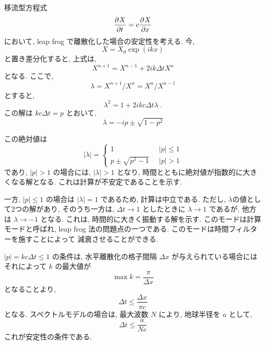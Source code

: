 移流型方程式 
\begin{equation}
  \DP{X}{t} = c \DP{X}{x}
\end{equation}
において,  leap frog で離散化した場合の安定性を考える.
今, 
\begin{displaymath}
  X = X_0 \exp(ikx)
\end{displaymath}
と置き差分化すると, 上式は,
\begin{equation}
  X^{n+1} = X^{n-1} + 2 i k \Delta t X^n
\end{equation}
となる.
ここで,
\begin{displaymath}
  \lambda = X^{n+1}/X^n = X^n/X^{n-1} 
\end{displaymath}
とすると,
\begin{equation}
  \lambda^2 = 1 + 2 i kc \Delta t \lambda \; .
\end{equation}
この解は $kc \Delta t = p$ とおいて,
\begin{equation}
 \lambda = -i p \pm \sqrt{1-p^2}
\end{equation}

この絶対値は
\begin{equation}
  |\lambda| = \left\{ 
             \begin{array}{ll}
               1                     & |p| \le 1 \\
               p \pm \sqrt{p^2-1} \;\;   & |p| > 1
             \end{array}
             \right.
\end{equation}
であり, $|p|>1$ の場合には, $|\lambda| > 1$ となり,
時間とともに絶対値が指数的に大きくなる解となる.
これは計算が不安定であることを示す.

一方, $|p| \le 1$ の場合は $|\lambda| = 1$ であるため,
計算は中立である.
ただし, $\lambda$の値として2つの解があり,
そのうち一方は, $\Delta t \rightarrow 1$ としたときに
$\lambda \rightarrow 1$ であるが, 
他方は $\lambda \rightarrow -1$ となる.
これは, 時間的に大きく振動する解を示す.
このモードは計算モードと呼ばれ, 
leap frog 法の問題点の一つである.
このモードは時間フィルターを施すことによって
減衰させることができる.

$|p|=kc \Delta t \le 1$ の条件は,
水平離散化の格子間隔 $\Delta x$ が与えられている場合には
それによって $k$ の最大値が
\begin{displaymath}
  \max k = \frac{\pi}{\Delta x}
\end{displaymath}
となることより,
\begin{equation}
   \Delta t \le \frac{\Delta x}{\pi c}
\end{equation}
となる.
スペクトルモデルの場合は, 最大波数 $N$ により,
地球半径を $a$ として,
\begin{equation}
   \Delta t \le \frac{a}{N c}  
\end{equation}
これが安定性の条件である.

